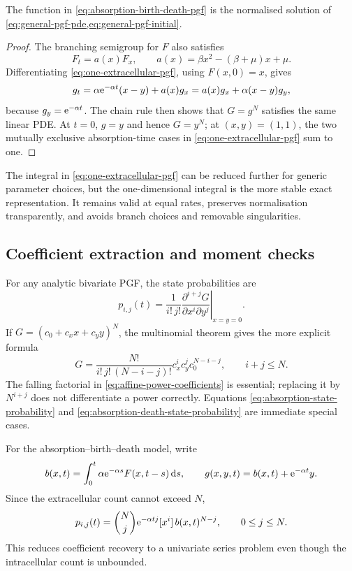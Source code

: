 \begin{proposition}
The function in \cref{eq:absorption-birth-death-pgf} is the normalised solution of \cref{eq:general-pgf-pde,eq:general-pgf-initial}.
\end{proposition}

\begin{proof}
The branching semigroup for $F$ also satisfies
\[
  F_t=a(x)F_x,
  \qquad
  a(x)=\beta x^2-(\beta+\mu)x+\mu.
\]
Differentiating \cref{eq:one-extracellular-pgf}, using $F(x,0)=x$, gives
\[
  g_t
  =\alpha\mathrm{e}^{-\alpha t}(x-y)+a(x)g_x
  =a(x)g_x+\alpha(x-y)g_y,
\]
because $g_y=\mathrm{e}^{-\alpha t}$.  The chain rule then shows that $G=g^N$ satisfies the same linear PDE\@.  At $t=0$, $g=y$ and hence $G=y^N$; at $(x,y)=(1,1)$, the two mutually exclusive absorption-time cases in \cref{eq:one-extracellular-pgf} sum to one.
\end{proof}

The integral in \cref{eq:one-extracellular-pgf} can be reduced further for generic parameter choices, but the one-dimensional integral is the more stable exact representation.  It remains valid at equal rates, preserves normalisation transparently, and avoids branch choices and removable singularities.

\subsection{Coefficient extraction and moment checks}
\label{sec:coefficient-extraction}

For any analytic bivariate PGF, the state probabilities are
\begin{equation}
  p_{i,j}(t)
  =\frac{1}{i!\,j!}
   \left.
   \frac{\partial^{i+j}G}
        {\partial x^i\partial y^j}
   \right|_{x=y=0}.
  \label{eq:general-coefficient-extraction}
\end{equation}
If $G=(c_0+c_x x+c_y y)^N$, the multinomial theorem gives the more explicit formula
\begin{equation}
  [x^{i}y^{j}]G
  =\frac{N!}{i!\,j!\,(N-i-j)!}
    c_x^i c_y^j c_0^{N-i-j},
  \qquad i+j\le N.
  \label{eq:affine-power-coefficients}
\end{equation}
The falling factorial in \cref{eq:affine-power-coefficients} is essential; replacing it by $N^{i+j}$ does not differentiate a power correctly.  Equations \eqref{eq:absorption-state-probability} and \eqref{eq:absorption-death-state-probability} are immediate special cases.

For the absorption--birth--death model, write
\[
  b(x,t)
  =\int_0^t\alpha\mathrm{e}^{-\alpha s}F(x,t-s)\,\mathrm{d} s,
  \qquad
  g(x,y,t)=b(x,t)+\mathrm{e}^{-\alpha t}y.
\]
Since the extracellular count cannot exceed $N$,
\begin{equation}
  p_{i,j}(t)
  =\binom{N}{j}\mathrm{e}^{-\alpha tj}
     [x^i]\,b(x,t)^{N-j},
  \qquad 0\le j\le N.
  \label{eq:abd-coefficients}
\end{equation}
This reduces coefficient recovery to a univariate series problem even though the intracellular count is unbounded.

